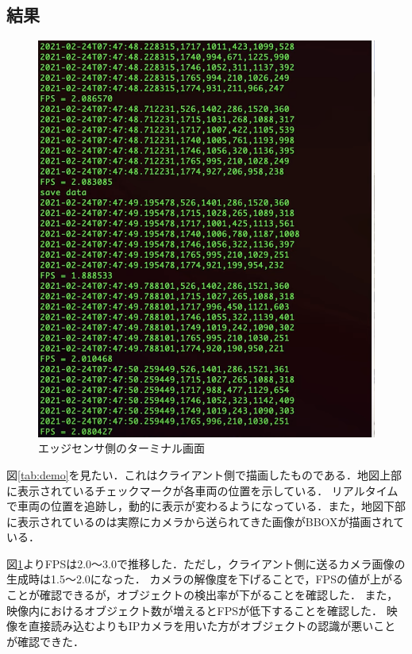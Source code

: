 \documentclass[technicalreport]{ieicej}
\begin{document}
\subsection{結果}
\begin{figure}[t]
  \includegraphics*[bb=0 100 200 400, width=1\linewidth]{./images/term.png}
  \caption{エッジセンサ側のターミナル画面} 
  \label{tab:term}
\end{figure}
図\ref{tab:demo}を見たい．これはクライアント側で描画したものである．地図上部に表示されているチェックマークが各車両の位置を示している．
リアルタイムで車両の位置を追跡し，動的に表示が変わるようになっている．また，地図下部に表示されているのは実際にカメラから送られてきた画像がBBOXが描画されている．

図\ref{tab:term}よりFPSは2.0〜3.0で推移した．ただし，クライアント側に送るカメラ画像の生成時は1.5〜2.0になった．
カメラの解像度を下げることで，FPSの値が上がることが確認できるが，オブジェクトの検出率が下がることを確認した．
また，映像内におけるオブジェクト数が増えるとFPSが低下することを確認した．
映像を直接読み込むよりもIPカメラを用いた方がオブジェクトの認識が悪いことが確認できた．
\end{document}
